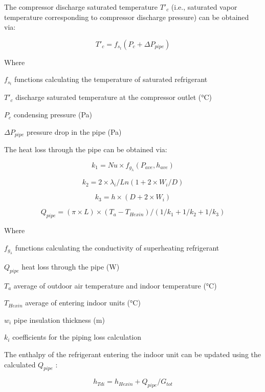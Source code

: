 The compressor discharge saturated temperature \(T'_c\) (i.e., saturated vapor temperature corresponding to compressor discharge pressure) can be obtained via:

\begin{equation}
T'_c = f_{s_t}(P_c+\Delta{P_{pipe}})
\end{equation}

Where

\(f_{s_t}\) functions calculating the temperature of saturated refrigerant

\(T'_c\) discharge saturated temperature at the compressor outlet (°C)

\(P_c\) condensing pressure (Pa)

\(\Delta{P_{pipe}}\) pressure drop in the pipe (Pa)

The heat loss through the pipe can be obtained via:

\begin{equation}
k_1 = Nu\times{f_{g_\lambda}(P_{ave},h_{ave})}
\end{equation}

\begin{equation}
k_2 = 2\times{\lambda_i}/Ln(1+2\times{W_i}/D)
\end{equation}

\begin{equation}
k_3 = h\times(D+2\times{W_i})
\end{equation}

\begin{equation}
Q_{pipe} = (\pi\times{L})\times(T_a-T_{Hexin})/(1/k_1+1/k_2+1/k_3)
\end{equation}

Where

\(f_{g_\lambda}\) functions calculating the conductivity of superheating refrigerant

\(Q_{pipe}\) heat loss through the pipe (W)

\(T_a\) average of outdoor air temperature and indoor temperature (°C)

\(T_{Hexin}\) average of entering indoor units (°C)

\(w_i\) pipe insulation thickness (m)

\(k_i\) coefficients for the piping loss calculation

The enthalpy of the refrigerant entering the indoor unit can be updated using the calculated \(Q_{pipe}\) :

\begin{equation}
h_{Tdi} = h_{Hexin}+Q_{pipe}/G_{tot}
\end{equation}

